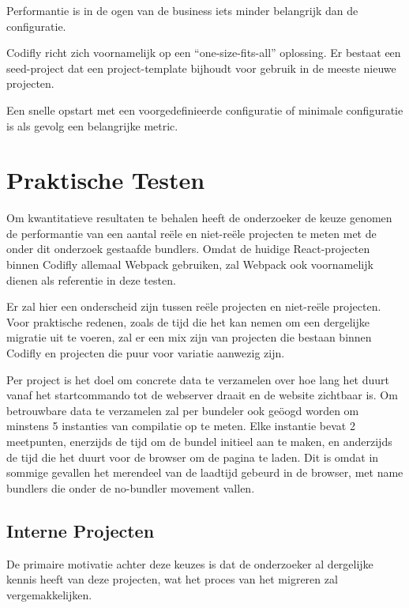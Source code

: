 Performantie is in de ogen van de business iets minder belangrijk dan de configuratie.


Codifly richt zich voornamelijk op een ``one-size-fits-all'' oplossing. Er bestaat een seed-project dat een project-template bijhoudt voor gebruik in de meeste nieuwe projecten.

Een snelle opstart met een voorgedefinieerde configuratie of minimale configuratie is als gevolg een belangrijke metric.

\section{Praktische Testen}

Om kwantitatieve resultaten te behalen heeft de onderzoeker de keuze genomen de performantie van een aantal reële en niet-reële projecten te meten met de onder dit onderzoek gestaafde bundlers. Omdat de huidige React-projecten binnen Codifly allemaal Webpack gebruiken, zal Webpack ook voornamelijk dienen als referentie in deze testen.

Er zal hier een onderscheid zijn tussen reële projecten en niet-reële projecten. Voor praktische redenen, zoals de tijd die het kan nemen om een dergelijke migratie uit te voeren, zal er een mix zijn van projecten die bestaan binnen Codifly en projecten die puur voor variatie aanwezig zijn.

Per project is het doel om concrete data te verzamelen over hoe lang het duurt vanaf het startcommando tot de webserver draait en de website zichtbaar is. Om betrouwbare data te verzamelen zal per bundeler ook geöogd worden om minstens 5 instanties van compilatie op te meten. Elke instantie bevat 2 meetpunten, enerzijds de tijd om de bundel initieel aan te maken, en anderzijds de tijd die het duurt voor de browser om de pagina te laden. Dit is omdat in sommige gevallen het merendeel van de laadtijd gebeurd in de browser, met name bundlers die onder de no-bundler movement vallen.

\todo[inline]{}

\subsection{Interne Projecten}

De primaire motivatie achter deze keuzes is dat de onderzoeker al dergelijke kennis heeft van deze projecten, wat het proces van het migreren zal vergemakkelijken.

